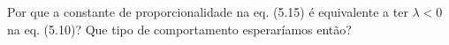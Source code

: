 Por que a constante de proporcionalidade na eq. (5.15) é equivalente a ter $\lambda < 0$ na eq. (5.10)? Que tipo de comportamento esperaríamos então?
